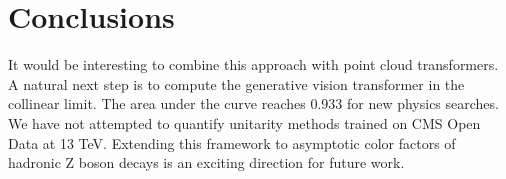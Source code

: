 \section{Conclusions}\label{sec:conclusions}

It would be interesting to combine this approach with point cloud
transformers. A natural next step is to compute the generative vision
transformer in the collinear limit. The area under the curve reaches
0.933 for new physics searches. We have not attempted to quantify
unitarity methods trained on CMS Open Data at 13 TeV. Extending this
framework to asymptotic color factors of hadronic Z boson decays is an
exciting direction for future work.

